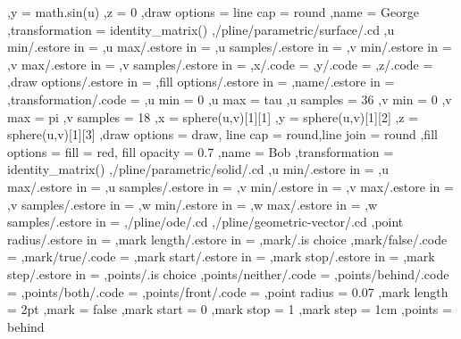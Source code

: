 {                ,y = {math.sin(u)}
                ,z = 0
                ,draw options = {line cap = round}
                ,name = George
                ,transformation = {identity_matrix()}
            ,/pline/parametric/surface/.cd %
                ,u min/.estore in = \tikz@td@p@surf@umin
                ,u max/.estore in = \tikz@td@p@surf@umax
                ,u samples/.estore in = \tikz@td@p@surf@usamples
                ,v min/.estore in = \tikz@td@p@surf@vmin
                ,v max/.estore in = \tikz@td@p@surf@vmax
                ,v samples/.estore in = \tikz@td@p@surf@vsamples
                ,x/.code = {\edef\tikz@td@p@surf@x{#1}}
                ,y/.code = {\edef\tikz@td@p@surf@y{#1}}
                ,z/.code = {\edef\tikz@td@p@surf@z{#1}}
                ,draw options/.estore in = \tikz@td@p@surf@drawoptions
                ,fill options/.estore in = \tikz@td@p@surf@filloptions
                ,name/.estore in = \tikz@td@p@surf@name
                ,transformation/.code = {\edef\tikz@td@p@surf@transformation{#1}}
                ,u min = 0
                ,u max = tau
                ,u samples = 36
                ,v min = 0
                ,v max = pi
                ,v samples = 18
                ,x = {sphere(u,v)[1][1]}
                ,y = {sphere(u,v)[1][2]}
                ,z = {sphere(u,v)[1][3]}
                ,draw options = {draw, line cap = round,line join = round}
                ,fill options = {fill = red, fill opacity = 0.7}
                ,name = Bob
                ,transformation = {identity_matrix()}
            ,/pline/parametric/solid/.cd %
                ,u min/.estore in = \tikz@td@p@s@umin
                ,u max/.estore in = \tikz@td@p@s@umax
                ,u samples/.estore in = \tikz@td@p@s@usamples
                ,v min/.estore in = \tikz@td@p@s@vmin
                ,v max/.estore in = \tikz@td@p@s@vmax
                ,v samples/.estore in = \tikz@td@p@s@vsamples
                ,w min/.estore in = \tikz@td@p@s@wmin
                ,w max/.estore in = \tikz@td@p@s@wmax
                ,w samples/.estore in = \tikz@td@p@s@wsamples
        ,/pline/ode/.cd %
        ,/pline/geometric-vector/.cd %
            ,point radius/.estore in = \tikz@td@gm@pointradius
            ,mark length/.estore in = \tikz@td@gm@marklength
            ,mark/.is choice 
                ,mark/false/.code = {\edef\tikz@td@gm@mark{0}}
                ,mark/true/.code = {\edef\tikz@td@gm@mark{1}}
            ,mark start/.estore in = \tikz@td@gm@markstart
            ,mark stop/.estore in = \tikz@td@gm@markstop
            ,mark step/.estore in = \tikz@td@gm@markstep
            ,points/.is choice 
                ,points/neither/.code = {\edef\tikz@td@gm@points{0}}
                ,points/behind/.code = {\edef\tikz@td@gm@points{1}}
                ,points/both/.code = {\edef\tikz@td@gm@points{2}}
                ,points/front/.code = {\edef\tikz@td@gm@points{3}}
            ,point radius = 0.07
            ,mark length = 2pt
            ,mark = false
            ,mark start = 0
            ,mark stop = 1
            ,mark step = 1cm
            ,points = behind
}
